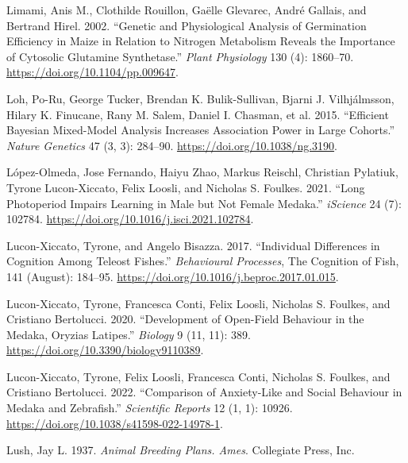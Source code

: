 \documentclass[
]{book}
\newlength{\cslhangindent}
\newlength{\cslentryspacingunit} %
\newenvironment{CSLReferences}[2] %
 {%
  \setlength{\parindent}{0pt}
  \ifodd #1
  \let\oldpar\par
  \def\par{\hangindent=\cslhangindent\oldpar}
  \fi
  \setlength{\parskip}{#2\cslentryspacingunit}
 }%
 {}
\begin{document}
\begin{CSLReferences}{1}{0}
\leavevmode{}%
Limami, Anis M., Clothilde Rouillon, Gaëlle Glevarec, André Gallais, and Bertrand Hirel. 2002. {``Genetic and {Physiological Analysis} of {Germination Efficiency} in {Maize} in {Relation} to {Nitrogen Metabolism Reveals} the {Importance} of {Cytosolic Glutamine Synthetase}.''} \emph{Plant Physiology} 130 (4): 1860--70. \url{https://doi.org/10.1104/pp.009647}.

\leavevmode{}%
Loh, Po-Ru, George Tucker, Brendan K. Bulik-Sullivan, Bjarni J. Vilhjálmsson, Hilary K. Finucane, Rany M. Salem, Daniel I. Chasman, et al. 2015. {``Efficient {Bayesian} Mixed-Model Analysis Increases Association Power in Large Cohorts.''} \emph{Nature Genetics} 47 (3, 3): 284--90. \url{https://doi.org/10.1038/ng.3190}.

\leavevmode{}%
López-Olmeda, Jose Fernando, Haiyu Zhao, Markus Reischl, Christian Pylatiuk, Tyrone Lucon-Xiccato, Felix Loosli, and Nicholas S. Foulkes. 2021. {``Long Photoperiod Impairs Learning in Male but Not Female Medaka.''} \emph{iScience} 24 (7): 102784. \url{https://doi.org/10.1016/j.isci.2021.102784}.

\leavevmode{}%
Lucon-Xiccato, Tyrone, and Angelo Bisazza. 2017. {``Individual Differences in Cognition Among Teleost Fishes.''} \emph{Behavioural Processes}, The {Cognition} of {Fish}, 141 (August): 184--95. \url{https://doi.org/10.1016/j.beproc.2017.01.015}.

\leavevmode{}%
Lucon-Xiccato, Tyrone, Francesca Conti, Felix Loosli, Nicholas S. Foulkes, and Cristiano Bertolucci. 2020. {``Development of {Open-Field Behaviour} in the {Medaka}, {Oryzias} Latipes.''} \emph{Biology} 9 (11, 11): 389. \url{https://doi.org/10.3390/biology9110389}.

\leavevmode{}%
Lucon-Xiccato, Tyrone, Felix Loosli, Francesca Conti, Nicholas S. Foulkes, and Cristiano Bertolucci. 2022. {``Comparison of Anxiety-Like and Social Behaviour in Medaka and Zebrafish.''} \emph{Scientific Reports} 12 (1, 1): 10926. \url{https://doi.org/10.1038/s41598-022-14978-1}.

\leavevmode{}%
Lush, Jay L. 1937. \emph{Animal Breeding Plans. {Ames}}. {Collegiate Press, Inc}.


\end{CSLReferences}
\end{document}
